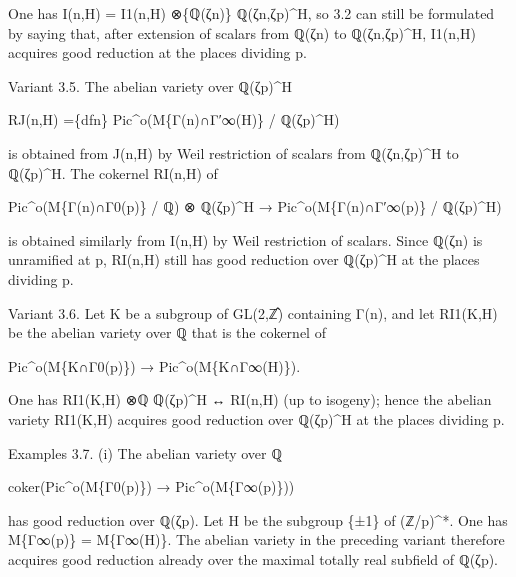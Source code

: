 \documentclass[11pt,a4paper]{article}
\begin{document}
One has I(n,H) = I\textunderscore{}1(n,H) ⊗\textunderscore{}\{ℚ(ζ\textunderscore{}n)\} ℚ(ζ\textunderscore{}n,ζ\textunderscore{}p)\textasciicircum{}H, so 3.2 can still be formulated by saying that, after extension of scalars from ℚ(ζ\textunderscore{}n) to ℚ(ζ\textunderscore{}n,ζ\textunderscore{}p)\textasciicircum{}H, I\textunderscore{}1(n,H) acquires good reduction at the places dividing p.

Variant 3.5. The abelian variety over ℚ(ζ\textunderscore{}p)\textasciicircum{}H

RJ(n,H) =\textunderscore{}\{dfn\} Pic\textasciicircum{}o(M\textunderscore{}\{Γ(n)∩Γ′\textunderscore{}∞(H)\} / ℚ(ζ\textunderscore{}p)\textasciicircum{}H)

is obtained from J(n,H) by Weil restriction of scalars from ℚ(ζ\textunderscore{}n,ζ\textunderscore{}p)\textasciicircum{}H to ℚ(ζ\textunderscore{}p)\textasciicircum{}H. The cokernel RI(n,H) of

Pic\textasciicircum{}o(M\textunderscore{}\{Γ(n)∩Γ\textunderscore{}0(p)\} / ℚ) ⊗ ℚ(ζ\textunderscore{}p)\textasciicircum{}H → Pic\textasciicircum{}o(M\textunderscore{}\{Γ(n)∩Γ′\textunderscore{}∞(p)\} / ℚ(ζ\textunderscore{}p)\textasciicircum{}H)

is obtained similarly from I(n,H) by Weil restriction of scalars. Since ℚ(ζ\textunderscore{}n) is unramified at p, RI(n,H) still has good reduction over ℚ(ζ\textunderscore{}p)\textasciicircum{}H at the places dividing p.

Variant 3.6. Let K be a subgroup of GL(2,ℤ̂) containing Γ(n), and let RI\textunderscore{}1(K,H) be the abelian variety over ℚ that is the cokernel of

Pic\textasciicircum{}o(M\textunderscore{}\{K∩Γ\textunderscore{}0(p)\}) → Pic\textasciicircum{}o(M\textunderscore{}\{K∩Γ\textunderscore{}∞(H)\}).

One has RI\textunderscore{}1(K,H) ⊗\textunderscore{}ℚ ℚ(ζ\textunderscore{}p)\textasciicircum{}H ↔ RI(n,H) (up to isogeny); hence the abelian variety RI\textunderscore{}1(K,H) acquires good reduction over ℚ(ζ\textunderscore{}p)\textasciicircum{}H at the places dividing p.

Examples 3.7. (i) The abelian variety over ℚ

coker(Pic\textasciicircum{}o(M\textunderscore{}\{Γ\textunderscore{}0(p)\}) → Pic\textasciicircum{}o(M\textunderscore{}\{Γ\textunderscore{}∞(p)\}))

has good reduction over ℚ(ζ\textunderscore{}p). Let H be the subgroup \{±1\} of (ℤ/p)\textasciicircum{}*. One has M\textunderscore{}\{Γ\textunderscore{}∞(p)\} = M\textunderscore{}\{Γ\textunderscore{}∞(H)\}. The abelian variety in the preceding variant therefore acquires good reduction already over the maximal totally real subfield of ℚ(ζ\textunderscore{}p).
\end{document}
